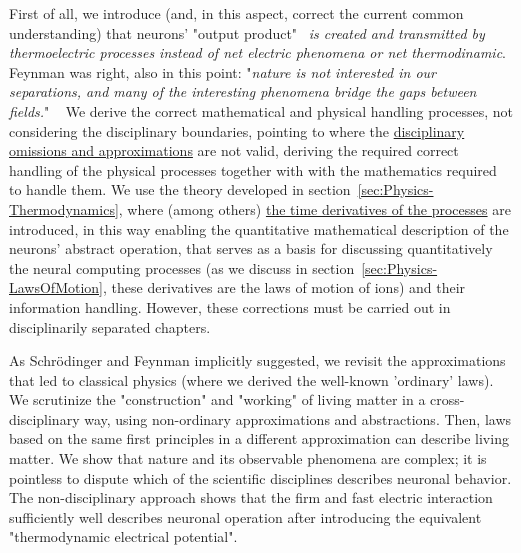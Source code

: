 First of all, we introduce (and, in this aspect, correct the current common understanding)
that neurons' "output product"~\cite{BuzsakiCellAssemblies:2010}
\textit{is created and transmitted by thermoelectric processes instead of
	net electric phenomena or net thermodinamic}.
	Feynman was right, also in this point: "\textit{nature is not interested in our separations, and many of the interesting phenomena bridge the gaps between fields.}" ~\cite{FeynmanThinking:1980}
We derive the correct mathematical and physical handling processes,
not considering the disciplinary boundaries, pointing to where
the \hyperlink{Abstractions}{disciplinary omissions and approximations} are not valid,
deriving the required correct handling of the physical processes together with with the mathematics required to handle them.
We use the theory developed in section~\ref{sec:Physics-Thermodynamics},
where (among others) \hyperlink{NernstPlanckTimeDerivatives}{the time derivatives of the processes} are introduced, in this way enabling the
quantitative mathematical description of the neurons' abstract operation,
that serves as a basis for discussing quantitatively the neural computing
processes (as we discuss in section~\ref{sec:Physics-LawsOfMotion},
these derivatives are the laws of motion of ions) and their information handling. However, these corrections must be carried out
in disciplinarily separated chapters.  


As Schr\"odinger and Feynman implicitly suggested, we revisit the approximations that led to classical physics (where we derived the well-known 'ordinary' laws).
We scrutinize the "construction" and "working" of living matter in a cross-disciplinary way, using non-ordinary approximations and abstractions.
Then, laws based on the same first principles in a different approximation can describe living matter.
We show that nature and its observable phenomena are complex; it is pointless to dispute
which of the scientific disciplines describes neuronal behavior. The non-disciplinary approach shows that the firm and fast electric interaction sufficiently well describes neuronal operation after introducing the equivalent "thermodynamic electrical potential".



 
